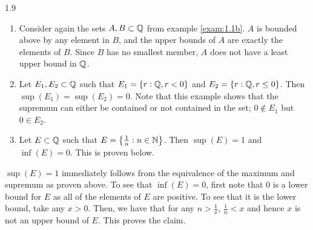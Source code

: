 \begin{comment}
\begin{nproof}
    Let $E \subset S$ and $\alpha = \max(E)$. By definition $\alpha$ is an upper bound of $E$, and if $x < \alpha$ for some $x \in E$ then $x$ is not an upper bound of $E$ as it is not greater than $\alpha \in E$. The claim follows (with an identical proof for the minimum).
\end{nproof}
\end{comment}

\begin{example}{}{1.9}
    \begin{enumerate}
        \item Consider again the sets $A, B \subset \mathbb{Q}$ from example \ref{exam:1.1b}. $A$ is bounded above by any element in $B$, and the upper bounds of $A$ are exactly the elements of $B$. Since $B$ has no smallest member, $A$ does not have a least upper bound in $\mathbb{Q}$.
        \item Let $E_1, E_2 \subset \mathbb{Q}$ such that $E_1 = \set{r: \mathbb{Q}, r < 0}$ and $E_2 = \set{r: \mathbb{Q}, r \leq 0}$. Then $\sup(E_1) = \sup(E_2) = 0$. Note that this example shows that the supremum can either be contained or not contained in the set; $0 \notin E_1$ but $0 \in E_2$. 
        \item Let $E \subset \mathbb{Q}$ such that $E = \set{\frac{1}{n}: n \in \mathbb{N}}$. Then $\sup(E) = 1$ and $\inf(E) = 0$. This is proven below. 
    \end{enumerate}
\end{example}
\begin{nproof}
    $\sup(E) = 1$ immediately follows from the equivalence of the maximum and supremum as proven above. To see that $\inf(E) = 0$, first note that $0$ is a lower bound for $E$ as all of the elements of $E$ are positive. To see that it is the lower bound, take any $x > 0$. Then, we have that for any $n > \frac{1}{x}$, $\frac{1}{n} < x$ and hence $x$ is not an upper bound of $E$. This proves the claim.
\end{nproof}


